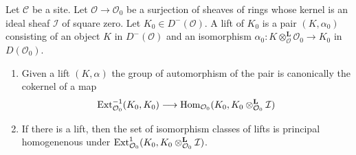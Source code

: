 \begin{lemma}
\label{lemma-first-order-defos-complex}
Let $\mathcal{C}$ be a site. Let $\mathcal{O} \to \mathcal{O}_0$
be a surjection of sheaves of rings whose kernel is an ideal sheaf
$\mathcal{I}$ of square zero. Let $K_0 \in D^-(\mathcal{O})$.
A lift of $K_0$ is a pair $(K, \alpha_0)$ consisting of an object
$K$ in $D^-(\mathcal{O})$ and an isomorphism
$\alpha_0 : K \otimes_\mathcal{O}^\mathbf{L} \mathcal{O}_0 \to K_0$
in $D(\mathcal{O}_0)$.
\begin{enumerate}
\item Given a lift $(K, \alpha)$ the group of automorphism of the pair
is canonically the cokernel of a map
$$
\mathop{\mathrm{Ext}}\nolimits^{-1}_{\mathcal{O}_0}(K_0, K_0)
\longrightarrow
\mathop{\mathrm{Hom}}\nolimits_{\mathcal{O}_0}(K_0, K_0 \otimes_{\mathcal{O}_0}^\mathbf{L} \mathcal{I})
$$
\item If there is a lift, then the set of isomorphism classes of lifts
is principal homogenenous under
$\mathop{\mathrm{Ext}}\nolimits^1_{\mathcal{O}_0}(K_0,
K_0 \otimes_{\mathcal{O}_0}^\mathbf{L} \mathcal{I})$.
\end{enumerate}
\end{lemma}

